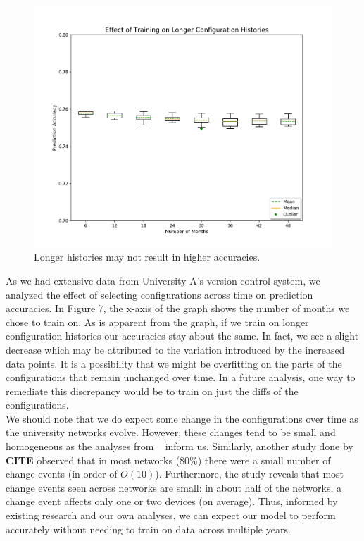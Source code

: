 \begin{figure}[H]
	\centering
	\includegraphics[width=\textwidth]{time.png}
	\caption{Longer histories may not result in higher accuracies.}
\end{figure}

As we had extensive data from University A's version control system, we analyzed the effect of selecting configurations across time on prediction accuracies. In Figure 7, the x-axis of the graph shows the number of months we chose to train on. As is apparent from the graph, if we train on longer configuration histories our accuracies stay about the same. In fact, we see a slight decrease which may be attributed to the variation introduced by the increased data points. It is a possibility that we might be overfitting on the parts of the configurations that remain unchanged over time. In a future analysis, one way to remediate this discrepancy would be to train on just the diffs of the configurations.\\

We should note that we do expect some change in the configurations over time as the university networks evolve. However, these changes tend to be small and homogeneous as the analyses from ~\cite{Kim} inform us. Similarly, another study done by \textbf{CITE} observed that in most networks (80\%) there were a small number of change events (in order of $O(10)$). Furthermore, the study reveals that most change events seen across networks are small: in about half of the networks, a change event affects only one or two devices (on average). Thus, informed by existing research and our own analyses, we can expect our model to perform accurately without needing to train on data across multiple years.

